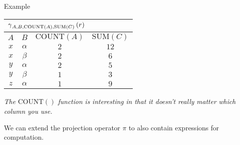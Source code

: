 \begin{multicols}{2}
\begin{CheatsheetEntryFrame}
\begin{RelAlgSubsection}{Example}
\begin{center}
{                \begin{tabular}{|cccc|}
                    \multicolumn{4}{l}{\normalsize $\operatorname{\gamma}_{A, B, \text{COUNT}(A), \text{SUM}(C)}{(r)}$}
                        \\ \hline
                    \multicolumn{1}{|c}{$A$}
                        & \multicolumn{1}{c}{$B$}
                        & \multicolumn{1}{c}{$\text{COUNT}(A)$}
                        & \multicolumn{1}{c|}{$\text{SUM}(C)$}
                        \\ \hline\hline
                    $x$ & $\alpha$ & $2$ & $12$ \\
                    $x$ & $\beta $ & $2$ & $6$ \\
                    $y$ & $\alpha$ & $2$ & $5$ \\
                    $y$ & $\beta $ & $1$ & $3$ \\
                    $z$ & $\alpha$ & $1$ & $9$ \\ \hline
                \end{tabular}
            }
        \end{center}
        \medskip
        {\footnotesize%
            \textit{The $\text{COUNT}()$ function is interesting in that it doesn't really matter which column you use.}
        }
        \end{RelAlgSubsection}

    \end{CheatsheetEntryFrame}

    \begin{CheatsheetEntryFrame}

         \MarkExtendedRelAlg

        We can extend the projection operator $\pi$ to also contain expressions for computation.


\end{CheatsheetEntryFrame}
\end{multicols}
